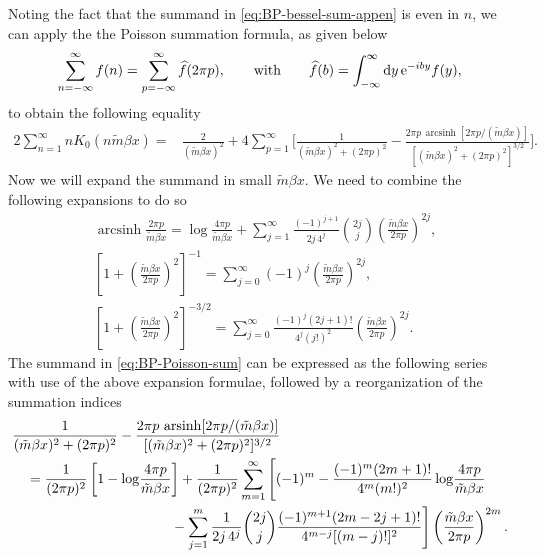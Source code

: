 \documentclass[a4paper,11pt]{article}
\newcommand{\e}{\mathrm e}
\newcommand{\dd}{\mathrm d}
\begin{document}
Noting the fact that the summand in \eqref{eq:BP-bessel-sum-appen} is even in $n$, we can apply the 
the Poisson summation formula, as given below 
\begin{equation}
	\sum_{n=-\infty}^{\infty}f(n)
	=
	\sum_{p=-\infty}^{\infty}\widehat f(2\pi p),
	\label{eq:BP-Poisson-general}
	\qquad {\rm with}\qquad \widehat f(b)=\int_{-\infty}^{\infty}\dd y\,\e^{-iby}f(y),
\end{equation}
to obtain the following equality
\begin{align}
	2\sum_{n=1}^{\infty}nK_0(n\tilde m\beta x)
	={}&
	\frac{2}{(\tilde m\beta x)^2}
	+
	4\sum_{p=1}^{\infty}
	\Bigg[
	\frac{1}{(\tilde m\beta x)^2+(2\pi p)^2}
	-
	\frac{2\pi p\,
		\operatorname{arcsinh}[2\pi p/(\tilde m\beta x)]}
	{[(\tilde m\beta x)^2+(2\pi p)^2]^{3/2}}
	\Bigg].
	\label{eq:BP-Poisson-sum}
\end{align}
Now we will expand the summand in small $\tilde m \beta x$. We need to combine the following expansions to do so
\begin{align}
&	\operatorname{arcsinh}\!\frac{2\pi p}{\tilde m\beta x}
	={\log\!\frac{4\pi p}{\tilde m\beta x}}
	+\sum_{j=1}^\infty
	\frac{(-1)^{j+1}}{2j\,4^j}\binom{2j}{j}
	\left(\frac{\tilde m\beta x}{2\pi p}\right)^{2j},
	\nonumber\\
&	\left[1+\left(\frac{\tilde m\beta x}{2\pi p}\right)^2\right]^{-1}
	=\sum_{j=0}^\infty(-1)^j
	\left(\frac{\tilde m\beta x}{2\pi p}\right)^{2j},
	\nonumber\\
&	\left[1+\left(\frac{\tilde m\beta x}{2\pi p}\right)^2\right]^{-3/2}
	=\sum_{j=0}^\infty
	\frac{(-1)^j(2j+1)!}{4^j(j!)^2}
	\left(\frac{\tilde m\beta x}{2\pi p}\right)^{2j}.
	\label{eq:BP-denom32-expansion}
\end{align}
The summand in
\eqref{eq:BP-Poisson-sum} can be expressed as the following series with use of the above expansion formulae, followed by a reorganization of the summation indices
\begin{align}
	&\frac{1}{(\tilde m\beta x)^2+(2\pi p)^2}
	-\frac{2\pi p\,
		\operatorname{arsinh}[2\pi p/(\tilde m\beta x)]}
	{[(\tilde m\beta x)^2+(2\pi p)^2]^{3/2}}
	\nonumber\\
	&\quad=
	\frac{1}{(2\pi p)^2}
	\left[
	1-\log\!\frac{4\pi p}{\tilde m\beta x}
	\right]
	+
	\frac{1}{(2\pi p)^2}
	\sum_{m=1}^{\infty}
	\Bigg[
	(-1)^m
	-\frac{(-1)^m(2m+1)!}{4^m(m!)^2}
	\log\!\frac{4\pi p}{\tilde m\beta x}
	\nonumber\\
	&\hspace{40mm}
	-\sum_{j=1}^{m}
	\frac{1}{2j\,4^j}
	\binom{2j}{j}
	\frac{(-1)^{m+1}(2m-2j+1)!}
	{4^{m-j}[(m-j)!]^2}
	\Bigg]
	\left(
	\frac{\tilde m\beta x}{2\pi p}
	\right)^{2m}.
	\label{eq:BP-Cauchy-coefficient}
\end{align}
\end{document}
